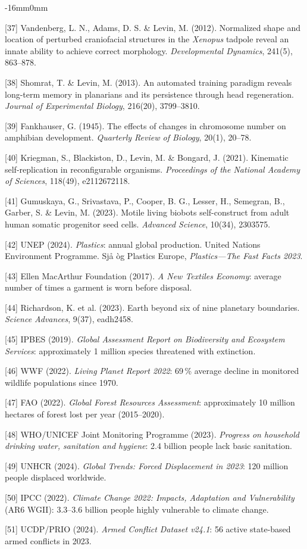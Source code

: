 \documentclass[10pt,oneside]{book}
\newcommand{\refentry}[1]{%
  \par\addvspace{0pt}%
  \begingroup\footnotesize\linespread{0.92}\selectfont
  \noindent\hangindent=4mm\hangafter=1 #1\par%
  \endgroup
}
\newenvironment{widebody}{%
  \begin{adjustwidth}{-16mm}{0mm}%
}{%
  \end{adjustwidth}%
}
\begin{document}
\begin{widebody}
\refentry{[37] Vandenberg, L. N., Adams, D. S. \& Levin, M. (2012). Normalized shape and location of perturbed craniofacial structures in the \textit{Xenopus} tadpole reveal an innate ability to achieve correct morphology. \textit{Developmental Dynamics}, 241(5), 863--878.}
\refentry{[38] Shomrat, T. \& Levin, M. (2013). An automated training paradigm reveals long-term memory in planarians and its persistence through head regeneration. \textit{Journal of Experimental Biology}, 216(20), 3799--3810.}
\refentry{[39] Fankhauser, G. (1945). The effects of changes in chromosome number on amphibian development. \textit{Quarterly Review of Biology}, 20(1), 20--78.}
\refentry{[40] Kriegman, S., Blackiston, D., Levin, M. \& Bongard, J. (2021). Kinematic self-replication in reconfigurable organisms. \textit{Proceedings of the National Academy of Sciences}, 118(49), e2112672118.}
\refentry{[41] Gumuskaya, G., Srivastava, P., Cooper, B. G., Lesser, H., Semegran, B., Garber, S. \& Levin, M. (2023). Motile living biobots self-construct from adult human somatic progenitor seed cells. \textit{Advanced Science}, 10(34), 2303575.}
\refentry{[42] UNEP (2024). \textit{Plastics}: annual global production. United Nations Environment Programme. Sjå òg Plastics Europe, \textit{Plastics---The Fast Facts 2023}.}
\refentry{[43] Ellen MacArthur Foundation (2017). \textit{A New Textiles Economy}: average number of times a garment is worn before disposal.}
\refentry{[44] Richardson, K. et al. (2023). Earth beyond six of nine planetary boundaries. \textit{Science Advances}, 9(37), eadh2458.}
\refentry{[45] IPBES (2019). \textit{Global Assessment Report on Biodiversity and Ecosystem Services}: approximately 1 million species threatened with extinction.}
\refentry{[46] WWF (2022). \textit{Living Planet Report 2022}: 69\,\% average decline in monitored wildlife populations since 1970.}
\refentry{[47] FAO (2022). \textit{Global Forest Resources Assessment}: approximately 10 million hectares of forest lost per year (2015--2020).}
\refentry{[48] WHO/UNICEF Joint Monitoring Programme (2023). \textit{Progress on household drinking water, sanitation and hygiene}: 2.4 billion people lack basic sanitation.}
\refentry{[49] UNHCR (2024). \textit{Global Trends: Forced Displacement in 2023}: 120 million people displaced worldwide.}
\refentry{[50] IPCC (2022). \textit{Climate Change 2022: Impacts, Adaptation and Vulnerability} (AR6 WGII): 3.3--3.6 billion people highly vulnerable to climate change.}
\refentry{[51] UCDP/PRIO (2024). \textit{Armed Conflict Dataset v24.1}: 56 active state-based armed conflicts in 2023.}

\end{widebody}
\end{document}
